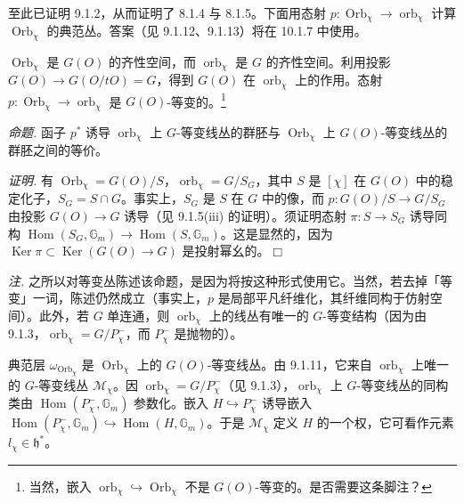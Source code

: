  至此已证明 9.1.2，从而证明了 8.1.4 与 8.1.5。下面用态射 $p:\operatorname{Orb}_{\chi}\to\operatorname{orb}_{\chi}$ 计算 $\operatorname{Orb}_{\chi}$ 的典范丛。答案（见 9.1.12、9.1.13）将在 10.1.7 中使用。

 $\operatorname{Orb}_{\chi}$ 是 $G(O)$ 的齐性空间，而 $\operatorname{orb}_{\chi}$ 是 $G$ 的齐性空间。利用投影 $G(O)\to G(O/tO)=G$，得到 $G(O)$ 在 $\operatorname{orb}_{\chi}$ 上的作用。态射 $p:\operatorname{Orb}_{\chi}\to\operatorname{orb}_{\chi}$ 是 $G(O)$-等变的。\footnote{当然，嵌入 $\operatorname{orb}_{\chi}\hookrightarrow\operatorname{Orb}_{\chi}$ 不是 $G(O)$-等变的。是否需要这条脚注？}

 \emph{命题.} 函子 $p^{*}$ 诱导 $\operatorname{orb}_{\chi}$ 上 $G$-等变线丛的群胚与 $\operatorname{Orb}_{\chi}$ 上 $G(O)$-等变线丛的群胚之间的等价。


\emph{证明.} 有 $\operatorname{Orb}_{\chi}=G(O)/S$，$\operatorname{orb}_{\chi}=G/S_{G}$，其中 $S$ 是 $[\chi]$ 在 $G(O)$ 中的稳定化子，$S_{G}=S\cap G$。事实上，$S_{G}$ 是 $S$ 在 $G$ 中的像，而 $p:G(O)/S\to G/S_{G}$ 由投影 $G(O)\to G$ 诱导（见 9.1.5(iii) 的证明）。须证明态射 $\pi:S\to S_{G}$ 诱导同构 $\operatorname{Hom}(S_{G},\mathbb{G}_{m})\to\operatorname{Hom}(S,\mathbb{G}_{m})$。这是显然的，因为 $\operatorname{Ker}\pi\subset\operatorname{Ker}(G(O)\to G)$ 是投射幂幺的。\hfill$\Box$

\emph{注.} 之所以对等变丛陈述该命题，是因为将按这种形式使用它。当然，若去掉「等变」一词，陈述仍然成立（事实上，$p$ 是局部平凡纤维化，其纤维同构于仿射空间）。此外，若 $G$ 单连通，则 $\operatorname{orb}_{\chi}$ 上的线丛有唯一的 $G$-等变结构（因为由 9.1.3，$\operatorname{orb}_{\chi}=G/P^{-}_{\chi}$，而 $P^{-}_{\chi}$ 是抛物的）。

 典范层 $\omega_{\operatorname{Orb}_{\chi}}$ 是 $\operatorname{Orb}_{\chi}$ 上的 $G(O)$-等变线丛。由 9.1.11，它来自 $\operatorname{orb}_{\chi}$ 上唯一的 $G$-等变线丛 $\mathcal{M}_{\chi}$。因 $\operatorname{orb}_{\chi}=G/P^{-}_{\chi}$（见 9.1.3），$\operatorname{orb}_{\chi}$ 上 $G$-等变线丛的同构类由 $\operatorname{Hom}(P^{-}_{\chi},\mathbb{G}_{m})$ 参数化。嵌入 $H\hookrightarrow P^{-}_{\chi}$ 诱导嵌入 $\operatorname{Hom}(P^{-}_{\chi},\mathbb{G}_{m})\hookrightarrow\operatorname{Hom}(H,\mathbb{G}_{m})$。于是 $\mathcal{M}_{\chi}$ 定义 $H$ 的一个权，它可看作元素 $l_{\chi}\in\mathfrak{h}^{*}$。

